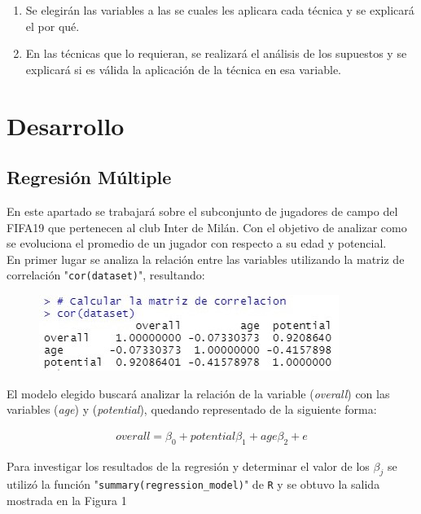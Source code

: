 \documentclass[a4paper,10pt,twocolumn]{article}
\begin{document}
\begin{enumerate}
	\item Se elegirán las variables a las se cuales les aplicara cada técnica y se explicará el por qué.
	\item En las técnicas que lo requieran,  se realizará el análisis de los supuestos y se explicará si es válida la aplicación de la técnica en esa variable.
\end{enumerate}


\section*{Desarrollo}\label{sec:dev}
  
\subsection*{Regresión Múltiple}

En este apartado se trabajará sobre el subconjunto de jugadores de campo del FIFA19 que pertenecen al club Inter de Milán. Con el objetivo de analizar como se evoluciona el promedio de un jugador con respecto a su edad y potencial.\\
En primer lugar se analiza la relación entre las variables utilizando la matriz de correlación "\verb|cor(dataset)|", resultando:

\begin{figure}[h]
	\includegraphics[scale=0.86]{./imgs/reg_correlation.jpg}
\end{figure}

El modelo elegido buscará analizar la relación de la variable (\textit{overall}) con las variables (\textit{age}) y (\textit{potential}), quedando representado de la siguiente forma:

\begin{align*}
overall = \beta_0 + potential \beta_1 + age \beta_2 + e
\end{align*}

Para investigar los resultados de la regresión y determinar el valor de los $\beta_j$ se utilizó la función "\verb|summary(regression_model)|" de \verb|R| y se obtuvo la salida mostrada en la Figura 1\\
\end{document}
